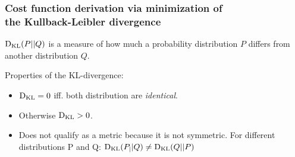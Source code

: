 \begin{frame}\frametitle{Cost function derivation via minimization of \\the Kullback-Leibler divergence}


$\mathrm{D}_{\mathrm{KL}}(P||Q)$ is a measure of how much a probability distribution $P$ differs from another distribution $Q$.

Properties of the KL-divergence:

\begin{itemize}
\item $\mathrm{D}_{\mathrm{KL}} = 0$ iff. both distribution are \emph{identical}.
\item Otherwise $\mathrm{D}_{\mathrm{KL}} > 0$.
\item Does not qualify as a metric because it is not symmetric. For different distributions P and Q: $\mathrm{D}_{\mathrm{KL}}(P_||Q) \ne \mathrm{D}_{\mathrm{KL}}(Q||P)$
\end{itemize}

\end{frame}


